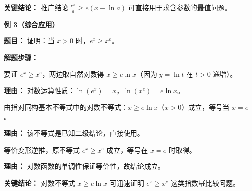 \begin{examplebox}
	\textbf{\textcolor{CExample}{关键结论：}}
	推广结论 $\frac{e^x}{a} \ge e(x-\ln a)$ 可直接用于求含参数的最值问题。

	\medskip
	\textbf{\textcolor{CExample}{例 3（综合应用）}}

	\textbf{\textcolor{CExample}{题目：}}
	证明：当 $x>0$ 时，$e^x \ge x^e$。

	\textbf{\textcolor{CExample}{解题步骤：}}
	\begin{description}[style=nextline, leftmargin=2.8em, labelsep=0.5em, itemsep=0.45em]
		\item[\textbf{第一步（取对数等价）：}] 要证 $e^x\ge x^e$，两边取自然对数得 $x \ge e\ln x$（因为 $y=\ln t$ 在 $t>0$ 递增）。
			\par\textbf{理由：} 对数运算性质：$\ln(e^x)=x$，$\ln(x^e)=e\ln x$。
		\item[\textbf{第二步（应用对数不等式）：}] 由指对同构基本不等式中的对数不等式：$x \ge e\ln x$（$x>0$）成立，等号当 $x=e$。
			\par\textbf{理由：} 该不等式是已知二级结论，直接使用。
		\item[\textbf{第三步（回代得证）：}] 等价变形逆推，原不等式 $e^x\ge x^e$ 成立，等号在 $x=e$ 时取得。
			\par\textbf{理由：} 对数函数的单调性保证等价性，故结论成立。
	\end{description}

	\textbf{\textcolor{CExample}{关键结论：}}
	对数不等式 $x\ge e\ln x$ 可迅速证明 $e^x\ge x^e$ 这类指数幂比较问题。
\end{examplebox}

